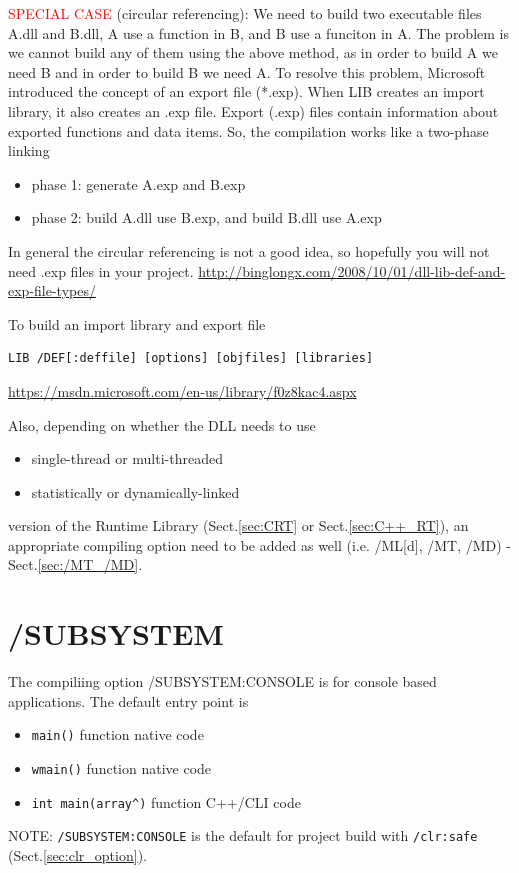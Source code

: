 \textcolor{red}{SPECIAL CASE} (circular referencing): We need to build two executable files A.dll and B.dll, A use a
function in B, and B use a funciton in A. The problem is we cannot build any of
them using the above method, as in order to build A we need B and in order to
build B we need A. To resolve this problem, Microsoft introduced the concept of
an export file (*.exp).  When LIB creates an import library, it also creates an .exp file. 
Export (.exp) files contain information about exported functions and data items. 
So, the compilation works like a two-phase linking
\begin{itemize}
  \item phase 1: generate A.exp and B.exp
  \item phase 2: build A.dll use B.exp, and build B.dll use A.exp
\end{itemize}
In general the circular referencing is not a good idea, so hopefully you will not need .exp files in your project.
\url{http://binglongx.com/2008/10/01/dll-lib-def-and-exp-file-types/}

To build an import library and export file
\begin{verbatim}
LIB /DEF[:deffile] [options] [objfiles] [libraries]
\end{verbatim}
\url{https://msdn.microsoft.com/en-us/library/f0z8kac4.aspx}


Also, depending on whether the DLL needs to use
\begin{itemize}
  \item single-thread or multi-threaded
  \item statistically or dynamically-linked
\end{itemize}
version of the Runtime Library (Sect.\ref{sec:CRT} or Sect.\ref{sec:C++_RT}), an
appropriate compiling option need to be added as well (i.e. /ML[d], /MT, /MD) - Sect.\ref{sec:/MT_/MD}.


\section{/SUBSYSTEM}
\label{sec:/SUBSYSTEM}

The compiliing option /SUBSYSTEM:CONSOLE is for console based applications. The default entry point is 
\begin{itemize}
  \item \verb!main()! function native code
  \item \verb!wmain()! function native code
  \item \verb!int main(array^)! function C++/CLI code
\end{itemize}
NOTE: \verb!/SUBSYSTEM:CONSOLE! is the default for project build with \verb!/clr:safe! (Sect.\ref{sec:clr_option}).

